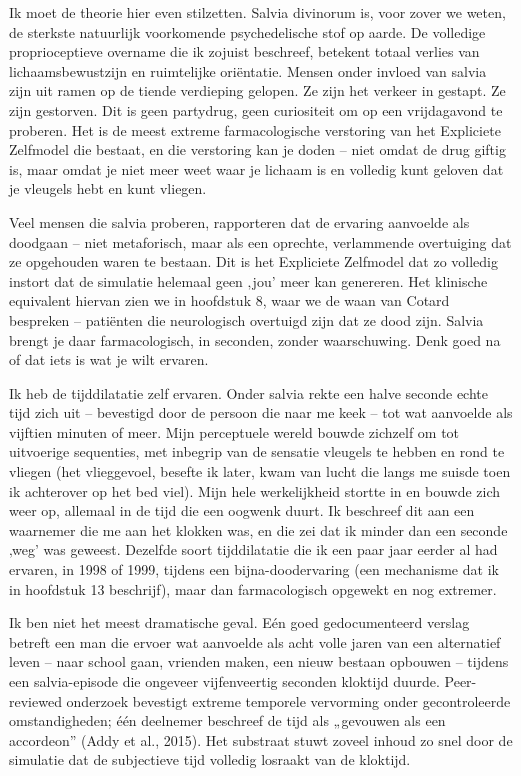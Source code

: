 \documentclass[11pt, twoside, openright]{book}
\begin{document}
Ik moet de theorie hier even stilzetten. Salvia divinorum is, voor zover we weten, de sterkste natuurlijk voorkomende psychedelische stof op aarde. De volledige proprioceptieve overname die ik zojuist beschreef, betekent totaal verlies van lichaamsbewustzijn en ruimtelijke oriëntatie. Mensen onder invloed van salvia zijn uit ramen op de tiende verdieping gelopen. Ze zijn het verkeer in gestapt. Ze zijn gestorven. Dit is geen partydrug, geen curiositeit om op een vrijdagavond te proberen. Het is de meest extreme farmacologische verstoring van het Expliciete Zelfmodel die bestaat, en die verstoring kan je doden -- niet omdat de drug giftig is, maar omdat je niet meer weet waar je lichaam is en volledig kunt geloven dat je vleugels hebt en kunt vliegen.

Veel mensen die salvia proberen, rapporteren dat de ervaring aanvoelde als doodgaan -- niet metaforisch, maar als een oprechte, verlammende overtuiging dat ze opgehouden waren te bestaan. Dit is het Expliciete Zelfmodel dat zo volledig instort dat de simulatie helemaal geen ‚jou' meer kan genereren. Het klinische equivalent hiervan zien we in hoofdstuk 8, waar we de waan van Cotard bespreken -- patiënten die neurologisch overtuigd zijn dat ze dood zijn. Salvia brengt je daar farmacologisch, in seconden, zonder waarschuwing. Denk goed na of dat iets is wat je wilt ervaren.

Ik heb de tijddilatatie zelf ervaren. Onder salvia rekte een halve seconde echte tijd zich uit -- bevestigd door de persoon die naar me keek -- tot wat aanvoelde als vijftien minuten of meer. Mijn perceptuele wereld bouwde zichzelf om tot uitvoerige sequenties, met inbegrip van de sensatie vleugels te hebben en rond te vliegen (het vlieggevoel, besefte ik later, kwam van lucht die langs me suisde toen ik achterover op het bed viel). Mijn hele werkelijkheid stortte in en bouwde zich weer op, allemaal in de tijd die een oogwenk duurt. Ik beschreef dit aan een waarnemer die me aan het klokken was, en die zei dat ik minder dan een seconde ‚weg' was geweest. Dezelfde soort tijddilatatie die ik een paar jaar eerder al had ervaren, in 1998 of 1999, tijdens een bijna-doodervaring (een mechanisme dat ik in hoofdstuk 13 beschrijf), maar dan farmacologisch opgewekt en nog extremer.

Ik ben niet het meest dramatische geval. Eén goed gedocumenteerd verslag betreft een man die ervoer wat aanvoelde als acht volle jaren van een alternatief leven -- naar school gaan, vrienden maken, een nieuw bestaan opbouwen -- tijdens een salvia-episode die ongeveer vijfenveertig seconden kloktijd duurde. Peer-reviewed onderzoek bevestigt extreme temporele vervorming onder gecontroleerde omstandigheden; één deelnemer beschreef de tijd als „gevouwen als een accordeon” (Addy et al., 2015). Het substraat stuwt zoveel inhoud zo snel door de simulatie dat de subjectieve tijd volledig losraakt van de kloktijd.
\end{document}

